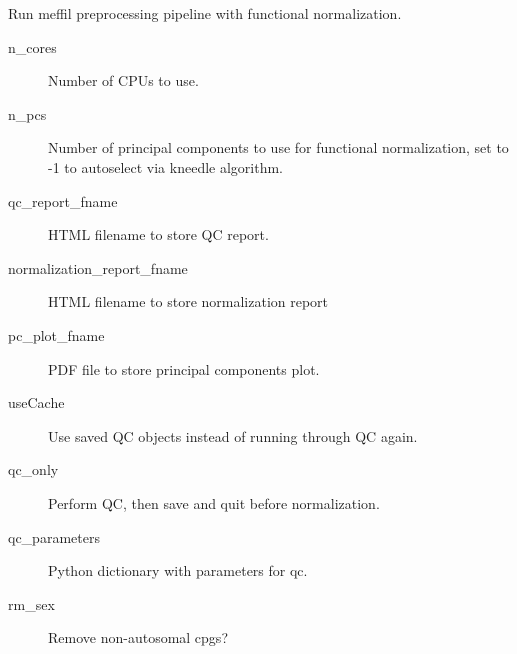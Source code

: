 \documentclass[letterpaper,10pt,english]{sphinxmanual}
\begin{document}
\begin{fulllineitems}

\begin{fulllineitems}
\label{\detokenize{index:pymethylprocess.PreProcessDataTypes.PreProcessIDAT.preprocessMeffil}}
Run meffil preprocessing pipeline with functional normalization.
\begin{description}
\item[{n\_cores}] \leavevmode
Number of CPUs to use.

\item[{n\_pcs}] \leavevmode
Number of principal components to use for functional normalization, set to -1 to autoselect via kneedle algorithm.

\item[{qc\_report\_fname}] \leavevmode
HTML filename to store QC report.

\item[{normalization\_report\_fname}] \leavevmode
HTML filename to store normalization report

\item[{pc\_plot\_fname}] \leavevmode
PDF file to store principal components plot.

\item[{useCache}] \leavevmode
Use saved QC objects instead of running through QC again.

\item[{qc\_only}] \leavevmode
Perform QC, then save and quit before normalization.

\item[{qc\_parameters}] \leavevmode
Python dictionary with parameters for qc.

\item[{rm\_sex}] \leavevmode
Remove non-autosomal cpgs?

\end{description}

\end{fulllineitems}


\end{fulllineitems}
\end{document}
